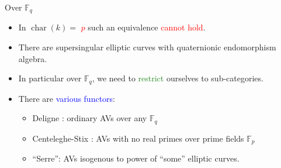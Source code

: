 \documentclass[usenames,dvipsnames]{beamer}
\newcommand{\downmapsto}{\rotatebox[origin=c]{-90}{$\large\mapsto$}\mkern2mu} %
\def\Q{\mathbb{Q}}
\def\Z{\mathbb{Z}}
\def\F{\mathbb{F}}
\DeclareMathOperator{\Char}{char}
\DeclareMathOperator{\rk}{Rank}
\DeclareMathOperator{\Frob}{Frob}
\newcommand{\set}[1]{\left\lbrace#1\right\rbrace }
\newcommand{\red}[1]{\textcolor{red}{#1}}
\newcommand{\blue}[1]{\textcolor{blue}{#1}}
\newcommand{\green}[1]{\textcolor{ForestGreen}{#1}}
\newtheorem{remark}[df]{Remark}
\begin{document}
\begin{frame}{ Over $\F_q$ }
\begin{itemize}
	\item In $\Char(k)=$ \red{$p$} such an equivalence \red{cannot hold}.
	\item There are supersingular elliptic curves with quaternionic endomorphism algebra.
	\item In particular over $\F_q$, we need to \green{restrict} ourselves to sub-categories.
	\item There are \blue{various functors}:
	\begin{itemize}
	    \item Deligne : ordinary AVs over any $\F_q$
	    \item Centeleghe-Stix : AVs with no real primes over prime fields $\F_p$
	    \item ``Serre'': AVs isogenous to power of ``some'' elliptic curves.
	\end{itemize}
\end{itemize}
\end{frame}

\end{document}

